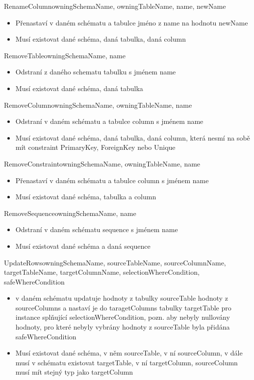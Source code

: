 \documentclass[11pt,twoside,a4paper]{book}
\begin{document}
\begin{list}{Operace :}{}
  \item RenameColumn{owningSchemaName, owningTableName, name, newName}
  \begin{itemize}
    \item Přenastaví v daném schématu a tabulce jméno z name na hodnotu newName
    \item  Musí existovat dané schéma, daná tabulka, daná column
  \end{itemize}

  \item RemoveTable{owningSchemaName, name}
  \begin{itemize}
    \item Odstraní z daného schematu tabulku s jménem name
    \item Musí existovat dané schéma, daná tabulka
  \end{itemize}

  \item RemoveColumn{owningSchemaName, owningTableName, name}
  \begin{itemize}
    \item Odstraní v daném schématu a tabulce column s jménem name
    \item Musí existovat dané schéma, daná tabulka, daná column, která nesmí na
    sobě mít constraint PrimaryKey, ForeignKey nebo Unique
  \end{itemize}

  \item RemoveConstraint{owningSchemaName, owningTableName, name}
  \begin{itemize}
    \item Přenastaví v daném schématu a tabulce column s jménem name
    \item  Musí existovat dané schéma, tabulka a column
  \end{itemize}

  \item RemoveSequence{owningSchemaName, name}
  \begin{itemize}
    \item Odstraní v daném schématu sequence s jménem name
    \item Musí existovat dané schéma a daná sequence
  \end{itemize}

  \item UpdateRows{owningSchemaName, sourceTableName,
  sourceColumnName, targetTableName, targetColumnName,
  selectionWhereCondition, safeWhereCondition}
  \begin{itemize}
    \item v daném schématu updatuje hodnoty z tabulky sourceTable hodnoty z
    sourceColumns a nastaví je do taragetColumns tabulky targetTable pro
    instance splňující selectionWhereCondition, pozn. aby nebyly nullovány
    hodnoty, pro které nebyly vybrány hodnoty z sourceTable byla přidána
    safeWhereCondition
    \item Musí existovat dané schéma, v něm sourceTable, v ní sourceColumn, v
    dále musí v schématu existovat targetTable, v ní targetColumn, sourceColumn
    musí mít stejný typ jako targetColumn
  \end{itemize}


\end{list}
\end{document}
